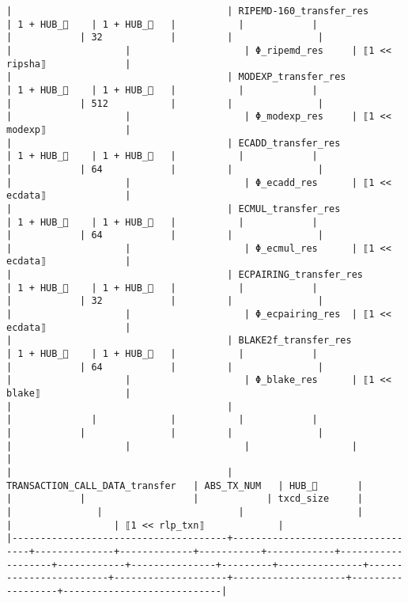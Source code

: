 \documentclass[varwidth=\maxdimen,margin=0.5cm,multi={verbatim}]{standalone}
\begin{document}
\begin{verbatim}
|                                      | RIPEMD-160_transfer_res          | 1 + HUB_    | 1 + HUB_   |           |            |                   |            | 32            |         |               |                        |                    |                    | Φ_ripemd_res     | ⟦1 << ripsha⟧              |
|                                      | MODEXP_transfer_res              | 1 + HUB_    | 1 + HUB_   |           |            |                   |            | 512           |         |               |                        |                    |                    | Φ_modexp_res     | ⟦1 << modexp⟧              |
|                                      | ECADD_transfer_res               | 1 + HUB_    | 1 + HUB_   |           |            |                   |            | 64            |         |               |                        |                    |                    | Φ_ecadd_res      | ⟦1 << ecdata⟧              |
|                                      | ECMUL_transfer_res               | 1 + HUB_    | 1 + HUB_   |           |            |                   |            | 64            |         |               |                        |                    |                    | Φ_ecmul_res      | ⟦1 << ecdata⟧              |
|                                      | ECPAIRING_transfer_res           | 1 + HUB_    | 1 + HUB_   |           |            |                   |            | 32            |         |               |                        |                    |                    | Φ_ecpairing_res  | ⟦1 << ecdata⟧              |
|                                      | BLAKE2f_transfer_res             | 1 + HUB_    | 1 + HUB_   |           |            |                   |            | 64            |         |               |                        |                    |                    | Φ_blake_res      | ⟦1 << blake⟧               |
|                                      |                                  |              |             |           |            |                   |            |               |         |               |                        |                    |                    |                  |                            |
|                                      | TRANSACTION_CALL_DATA_transfer   | ABS_TX_NUM   | HUB_       |           |            |                   |            | txcd_size     |         |               |                        |                    |                    |                  | ⟦1 << rlp_txn⟧             |
|--------------------------------------+----------------------------------+--------------+-------------+-----------+------------+-------------------+------------+---------------+---------+---------------+------------------------+--------------------+--------------------+------------------+----------------------------|

\end{verbatim}
\end{document}
